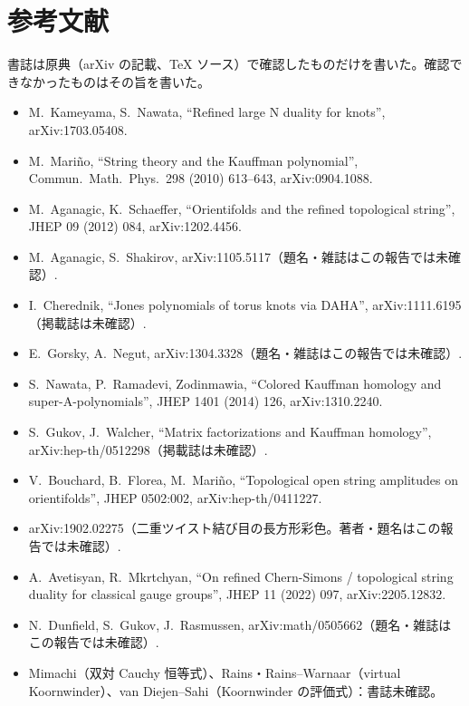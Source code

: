 \documentclass[a4paper,10pt]{ltjsarticle}
\begin{document}
\section*{参考文献}
書誌は原典（arXiv の記載、TeX ソース）で確認したものだけを書いた。確認できなかったものはその旨を書いた。
\begin{itemize}
\item[{[KN]}] M.~Kameyama, S.~Nawata, ``Refined large N duality for knots'', arXiv:1703.05408.
\item[{[Mar]}] M.~Mariño, ``String theory and the Kauffman polynomial'', Commun.\ Math.\ Phys.\ 298 (2010) 613--643, arXiv:0904.1088.
\item[{[AgSc]}] M.~Aganagic, K.~Schaeffer, ``Orientifolds and the refined topological string'', JHEP 09 (2012) 084, arXiv:1202.4456.
\item[{[AgSh]}] M.~Aganagic, S.~Shakirov, arXiv:1105.5117（題名・雑誌はこの報告では未確認）.
\item[{[Ch]}] I.~Cherednik, ``Jones polynomials of torus knots via DAHA'', arXiv:1111.6195（掲載誌は未確認）.
\item[{[GN]}] E.~Gorsky, A.~Negut, arXiv:1304.3328（題名・雑誌はこの報告では未確認）.
\item[{[NRZ]}] S.~Nawata, P.~Ramadevi, Zodinmawia, ``Colored Kauffman homology and super-A-polynomials'', JHEP 1401 (2014) 126, arXiv:1310.2240.
\item[{[GW]}] S.~Gukov, J.~Walcher, ``Matrix factorizations and Kauffman homology'', arXiv:hep-th/0512298（掲載誌は未確認）.
\item[{[BFM]}] V.~Bouchard, B.~Florea, M.~Mariño, ``Topological open string amplitudes on orientifolds'', JHEP 0502:002, arXiv:hep-th/0411227.
\item[{[KNTZ]}] arXiv:1902.02275（二重ツイスト結び目の長方形彩色。著者・題名はこの報告では未確認）.
\item[{[AM]}] A.~Avetisyan, R.~Mkrtchyan, ``On refined Chern-Simons / topological string duality for classical gauge groups'', JHEP 11 (2022) 097, arXiv:2205.12832.
\item[{[DGR]}] N.~Dunfield, S.~Gukov, J.~Rasmussen, arXiv:math/0505662（題名・雑誌はこの報告では未確認）.
\item Mimachi（双対 Cauchy 恒等式）、Rains・Rains--Warnaar（virtual Koornwinder）、van Diejen--Sahi（Koornwinder の評価式）：書誌未確認。
\end{itemize}
\end{document}
